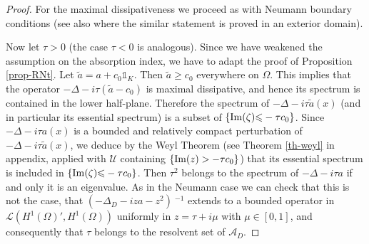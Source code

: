 \documentclass[10pt, a4paper,reqno]{amsart}
\theoremstyle{plain}
\theoremstyle{definition}
\theoremstyle{remark}
\begin{document}
\begin{proof}
{\noindent {\bf $\bullet$}\quad } For the maximal dissipativeness we proceed as with Neumann boundary conditions (see also \cite{alouik02} where the similar statement is proved in an exterior domain).

{\noindent {\bf $\bullet$}\quad } Now let ${\tau} > 0$ (the case ${\tau} < 0$ is analogous). Since we have weakened the assumption on the absorption index, we have to adapt the proof of Proposition \ref{prop-RNt}. Let $\tilde a = a + c_0 {\mathds 1}_{K}$. Then $\tilde a {\geqslant} c_0$ everywhere on ${\Omega}$. This implies that the operator $-{\Delta} - i{\tau}( \tilde a - c_0)$ is maximal dissipative, and hence its spectrum is contained in the lower half-plane. Therefore the spectrum of $-{\Delta} -i{\tau} \tilde a(x)$ (and in particular its essential spectrum) is a subset of ${\left\{ {{\mathop{\rm{Im}}\nolimits}({\zeta}) {\leqslant} - {\tau} c_0} \right\}}$. Since $-{\Delta} -i{\tau} a(x)$ is a bounded and relatively compact perturbation of $-{\Delta} -i{\tau} \tilde a(x)$, we deduce by the Weyl Theorem (see Theorem \ref{th-weyl} in appendix, applied with ${{\mathcal U}}$ containing ${\left\{ {{\mathop{\rm{Im}}\nolimits}(z) > - {\tau} c_0} \right\}}$) that its essential spectrum is included in ${\left\{ {{\mathop{\rm{Im}}\nolimits}({\zeta}) {\leqslant} - {\tau} c_0} \right\}}$. Then ${\tau}^2$ belongs to the spectrum of $-{\Delta} -i{\tau} a$ if and only it is an eigenvalue. As in the Neumann case we can check that this is not the case, that $(-{{\Delta}_D} - iza - z^2)\
{^{-1}}$ extends to a bounded operator in ${{\mathcal L}}(H^1({\Omega})',H^1({\Omega}))$ uniformly in $z = {\tau} + i{\mu}$ with ${\mu} \in [0,1]$, and consequently that 
${\tau}$ belongs to the resolvent set of ${{{\mathcal A}}_D}$.


\end{proof}
\end{document}
